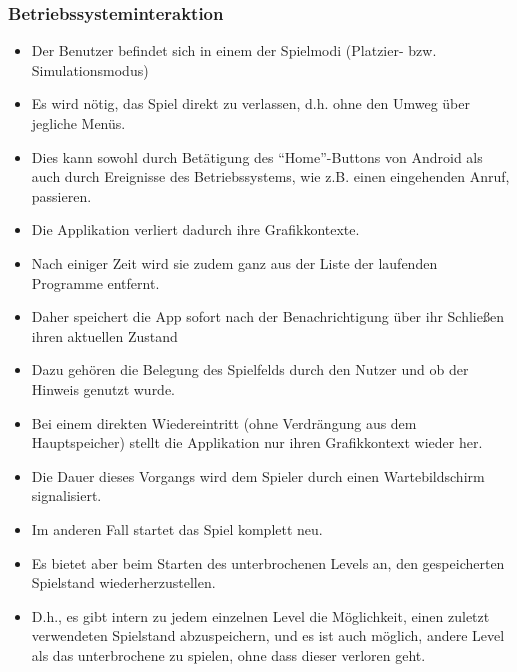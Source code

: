\subsubsection{Betriebssysteminteraktion}
\begin{itemize}
\item Der Benutzer befindet sich in einem der Spielmodi (Platzier- bzw. 
Simulationsmodus)
\item Es wird nötig, das Spiel direkt zu verlassen, d.h. ohne den Umweg über jegliche Menüs.
\item Dies kann sowohl durch Betätigung des "`Home"'-Buttons von Android als auch durch
Ereignisse des Betriebssystems, wie z.B. einen eingehenden Anruf, passieren.
\item Die Applikation verliert dadurch ihre Grafikkontexte.
\item Nach einiger Zeit wird sie zudem ganz aus der Liste der laufenden Programme entfernt.
\item Daher speichert die App sofort nach der Benachrichtigung über ihr Schließen ihren aktuellen Zustand
\item Dazu gehören die Belegung des Spielfelds durch den Nutzer und ob der Hinweis genutzt wurde.
\item Bei einem direkten Wiedereintritt (ohne Verdrängung aus dem Hauptspeicher) stellt die Applikation nur ihren Grafikkontext wieder her.
\item Die Dauer dieses Vorgangs wird dem Spieler durch einen Wartebildschirm signalisiert.
\item Im anderen Fall startet das Spiel komplett neu.
\item Es bietet aber beim Starten des unterbrochenen Levels an, den gespeicherten Spielstand wiederherzustellen. 
\item D.h., es gibt intern zu jedem einzelnen Level die Möglichkeit,
einen zuletzt verwendeten Spielstand abzuspeichern, und es ist auch möglich, andere Level als das
unterbrochene zu spielen, ohne dass dieser verloren geht.
\end{itemize}
